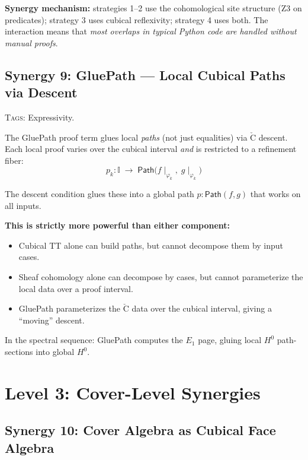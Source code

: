 \documentclass[11pt,a4paper]{article}
\theoremstyle{definition}
\theoremstyle{plain}
\newcommand{\Path}{\mathsf{Path}}
\newcommand{\Cech}{\check{\mathrm{C}}}
\newcommand{\Hzero}{H^0}
\newcommand{\restr}[2]{#1\!\!\mid_{#2}}
\newcommand{\interval}{\mathbb{I}}
\begin{document}
\textbf{Synergy mechanism:} strategies 1--2 use the cohomological
site structure (Z3 on predicates); strategy 3 uses cubical
reflexivity; strategy 4 uses both.  The interaction means that
\emph{most overlaps in typical Python code are handled without
manual proofs}.


\subsection{Synergy 9: GluePath --- Local Cubical Paths via Descent}
\label{sec:syn-gluepath}

\textsc{Tags:} Expressivity.

\medskip\noindent
The \textsf{GluePath} proof term glues local \emph{paths}
(not just equalities) via $\Cech$ descent.  Each local proof
varies over the cubical interval \emph{and} is restricted to a
refinement fiber:
\[
  p_k : \interval \;\to\;
  \Path\bigl(\restr{f}{\varphi_k},\;\restr{g}{\varphi_k}\bigr)
\]

The descent condition glues these into a global path
$p : \Path(f, g)$ that works on all inputs.

\textbf{This is strictly more powerful than either component:}
\begin{itemize}
\item Cubical TT alone can build paths, but cannot decompose
  them by input cases.
\item Sheaf cohomology alone can decompose by cases, but cannot
  parameterize the local data over a proof interval.
\item \textsf{GluePath} parameterizes the $\Cech$ data over the
  cubical interval, giving a ``moving'' descent.
\end{itemize}

In the spectral sequence: \textsf{GluePath} computes the $E_1$
page, gluing local $\Hzero$ path-sections into global $\Hzero$.


\section{Level 3: Cover-Level Synergies}
\label{sec:syn-covers}


\subsection{Synergy 10: Cover Algebra as Cubical Face Algebra}
\label{sec:syn-cover-face}
\end{document}
